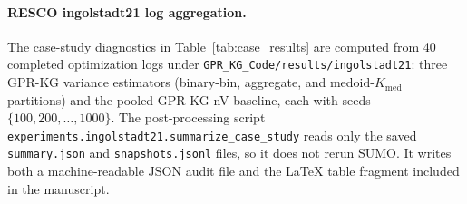 \documentclass[12pt]{article}
\theoremstyle{plain}
\theoremstyle{definition}
\theoremstyle{remark}
\begin{document}
\paragraph{RESCO ingolstadt21 log aggregation.}
The case-study diagnostics in Table~\ref{tab:case_results} are computed
from 40 completed optimization logs under
\texttt{GPR\_KG\_Code/results/ingolstadt21}: three GPR-KG variance
estimators (binary-bin, aggregate, and medoid-$K_{\mathrm{med}}$ partitions) and the
pooled GPR-KG-nV baseline, each with seeds
$\{100,200,\ldots,1000\}$.  The post-processing script
\texttt{experiments.ingolstadt21.summarize\_case\_study} reads only the
saved \texttt{summary.json} and \texttt{snapshots.jsonl} files, so it
does not rerun SUMO.  It writes both a machine-readable JSON audit file
and the LaTeX table fragment included in the manuscript.
\end{document}
